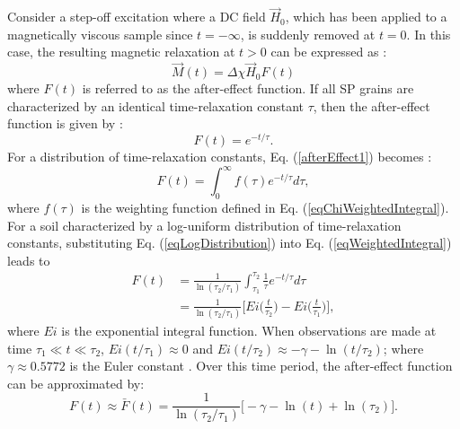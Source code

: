 \documentclass[onecolumn]{IEEEtran} %
\begin{document}
Consider a step-off excitation where a DC field $\vec H_0$, which has been applied to a magnetically viscous sample since $t = -\infty$, is suddenly removed at $t=0$. In this case, the resulting magnetic relaxation at $t >0$ can be expressed as \citep{Neel1949,Billings2003,Pasion2007}:
\begin{equation}
\vec M(t) = \Delta \chi \vec H_0 F(t)
\label{eqMagSte}
\end{equation}
where $F(t)$ is referred to as the after-effect function. If all SP grains are characterized by an identical time-relaxation constant $\tau$, then the after-effect function is given by \citep{Neel1949,Billings2003,Pasion2007}:
\begin{equation}
F (t) = e^{-t/\tau}. \label{afterEffect1}
\end{equation}
For a distribution of time-relaxation constants, Eq. (\ref{afterEffect1}) becomes \citep{Neel1949,Mullins1973,Billings2003,Pasion2007}:
\begin{equation}
\label{eqWeightedIntegral} F(t) = \int^{\infty}_0 f(\tau)
e^{-t/\tau} d \tau,
\end{equation}
where $f(\tau)$ is the weighting function defined in Eq. (\ref{eqChiWeightedIntegral}). For a soil characterized by a log-uniform distribution of time-relaxation constants, substituting Eq. (\ref{eqLogDistribution}) into Eq. (\ref{eqWeightedIntegral}) leads to
\begin{equation}
\begin{split}
F(t) &= \frac{1}{\ln(\tau_2/\tau_1)} \int^{\tau_2}_{\tau_1} \frac{1}{\tau} e^{-t/\tau} d \tau \\
& = \frac{1}{\ln(\tau_2/\tau_1)} \Bigg [ Ei \Big ( \frac{t}{\tau_2} \Big ) - Ei \Big ( \frac{t}{\tau_1} \Big ) \Bigg ],
\end{split}
\label{eqIntDist}
\end{equation}
where $Ei$ is the  exponential integral function. When observations are made at time $\tau_1 \ll t \ll \tau_2$, $Ei (t/\tau_1) \approx
0$ and $Ei (t/\tau_2) \approx -\gamma - \ln(t/\tau_2)$; where $\gamma \approx 0.5772$ is the Euler constant \cite{Pasion2007}. Over this time period, the after-effect function can be approximated by:
\begin{equation}
\label{eqAfterEffectB} F(t) \approx \bar F(t) = \frac{1}{\ln(\tau_2/\tau_1)} \big [ - \gamma - \ln(t) + \ln(\tau_2) \big ].
\end{equation}
\end{document}
